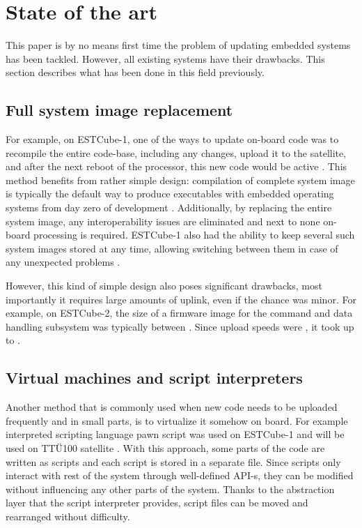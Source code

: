 \newpage
\section{State of the art}

This paper is by no means first time the problem of updating embedded systems has been tackled. However, all existing systems have their drawbacks. This section describes what has been done in this field previously.

\subsection{Full system image replacement}

For example, on ESTCube-1, one of the ways to update on-board code was to recompile the entire code-base, including any changes, upload it to the satellite, and after the next reboot of the processor, this new code would be active \cite{Suenter2016}. This method benefits from rather simple design: compilation of complete system image is typically the default way to produce executables with embedded operating systems from day zero of development . Additionally, by replacing the entire system image, any interoperability issues are eliminated and next to none on-board processing is required. ESTCube-1 also had the ability to keep several such system images stored at any time, allowing switching between them in case of any unexpected problems \cite{Tarbe2013}. 

However, this kind of simple design also poses significant drawbacks, most importantly it requires large amounts of uplink, even if the chance was minor. For example, on ESTCube-2, the size of a firmware image for the command and data handling subsystem was typically between . Since upload speeds were , it took up to . 

\subsection{Virtual machines and script interpreters}

Another method that is commonly used when new code needs to be uploaded frequently and in small parts, is to virtualize it somehow on board. For example interpreted scripting language pawn script was used on ESTCube-1 \cite{Suenter2016} and will be used on TTÜ100 satellite \cite{Aasavaeli2017}. With this approach, some parts of the code are written as scripts and each script is stored in a separate file. Since scripts only interact with rest of the system through well-defined API-s, they can be modified without influencing any other parts of the system. Thanks to the abstraction layer that the script interpreter provides, script files can be moved and rearranged without difficulty. 


